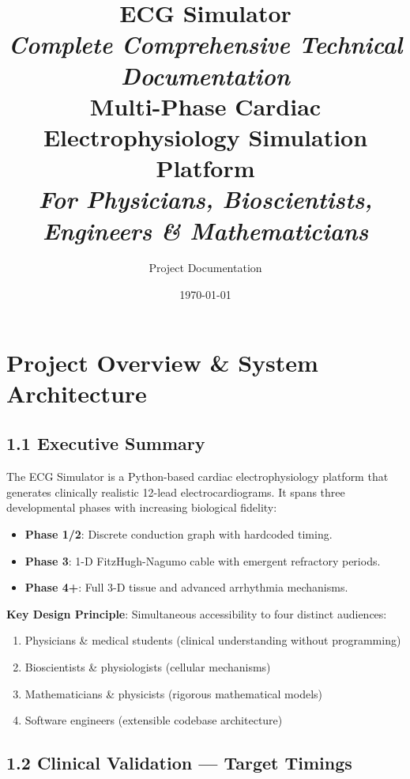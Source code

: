 \documentclass[12pt,oneside,a4paper]{book}
\title{%
  \Huge\textbf{ECG Simulator}\\
  \huge\textit{Complete Comprehensive Technical Documentation}\\
  \large{Multi-Phase Cardiac Electrophysiology Simulation Platform}\\
  \normalsize\textit{For Physicians, Bioscientists, Engineers \& Mathematicians}
}
\author{Project Documentation}
\date{\today}
\begin{document}
\maketitle
\tableofcontents
\listoffigures
\listoftables
\newpage


\chapter{Project Overview \& System Architecture}

\section{1.1 Executive Summary}

The ECG Simulator is a Python-based cardiac electrophysiology platform that generates clinically realistic 12-lead electrocardiograms. It spans three developmental phases with increasing biological fidelity:

\begin{itemize}
  \item \textbf{Phase 1/2}: Discrete conduction graph with hardcoded timing.
  \item \textbf{Phase 3}: 1-D FitzHugh-Nagumo cable with emergent refractory periods.
  \item \textbf{Phase 4+}: Full 3-D tissue and advanced arrhythmia mechanisms.
\end{itemize}

\textbf{Key Design Principle}: Simultaneous accessibility to four distinct audiences:

\begin{enumerate}
  \item Physicians \& medical students (clinical understanding without programming)
  \item Bioscientists \& physiologists (cellular mechanisms)
  \item Mathematicians \& physicists (rigorous mathematical models)
  \item Software engineers (extensible codebase architecture)
\end{enumerate}

\section{1.2 Clinical Validation — Target Timings}
\end{document}
